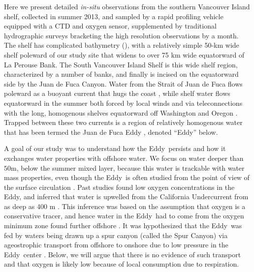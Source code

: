\documentclass[draft]{agujournal2019}
\newcommand*{\Eddy}{{\sc Eddy}}
\begin{document}
Here we present detailed \emph{in-situ} observations from the southern Vancouver Island shelf, collected in summer 2013, and sampled by a rapid profiling vehicle equipped with a CTD and oxygen sensor, supplemented by traditional hydrographic surveys bracketing the high resolution observations by a month. The shelf has complicated bathymetry (), with a relatively simple 50-km wide shelf poleward of our study site that widens to over 75 km wide equatorward of La Perouse Bank.  The South Vancouver Island Shelf is this wide shelf region, characterized by a number of banks, and finally is incised on the equatorward side by the Juan de Fuca Canyon.   Water from the Strait of Juan de Fuca flows poleward as a buoyant current that hugs the coast \cite{thomsonetal89, hickeyetal91}, while shelf water flows equatorward in the summer both forced by local winds and via teleconnections with the long, homogenous shelves equatorward off Washington and Oregon \cite{hickeyetal91,thomsonkrassovski15,engidaetal16}.  Trapped between these two currents is a region of relatively homogenous water that has been termed the Juan de Fuca Eddy \cite{freelanddenman82,freelandmcintosh89,foremanetal07,macfadyenhickey10}, denoted ``\Eddy'' below.

A goal of our study was to understand how the \Eddy\ persists and how it exchanges water properties with offshore water.  We focus on water deeper than $50 \mathrm{m}$, below the summer mixed layer, because this water is trackable with water mass properties, even though the \Eddy\ is often studied from the point of view of the surface circulation \cite{macfadyenhickey10}.  Past studies found low oxygen concentrations in the \Eddy, and inferred that water is upwelled from the California Undercurrent from as deep as 400 m \cite{freelanddenman82,deweycrawford88}.  This inference was based on the assumption that oxygen is a conservative tracer, and hence water in the \Eddy\ had to come from  the oxygen minimum zone found further offshore \cite{mackasetal87}.  It was hypothesized that the \Eddy\ was fed by waters being drawn up a spur canyon (called the Spur Canyon) via ageostrophic transport from offshore to onshore due to low pressure in the \Eddy\ center \cite{weaverhsieh87}.  Below, we will argue that there is no evidence of such transport and that oxygen is likely low because of local consumption due to respiration.
\end{document}
